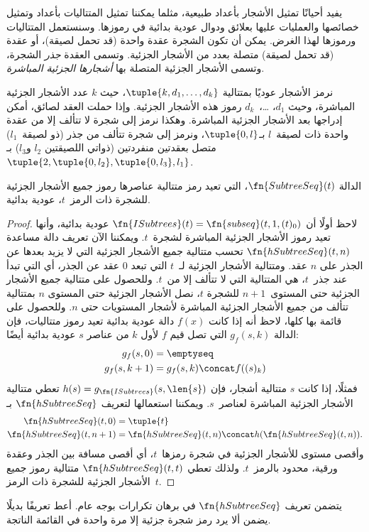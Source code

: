 \documentclass[../../../include/open-logic-section]{subfiles}
\begin{document}

يفيد أحيانًا تمثيل الأشجار بأعداد طبيعية، مثلما يمكننا تمثيل المتتاليات
بأعداد وتمثيل خصائصها والعمليات عليها بعلائق ودوال عودية بدائية في
رموزها. وسنستعمل المتتاليات ورموزها لهذا الغرض. يمكن أن تكون الشجرة
عقدة واحدة (قد تحمل لصيقة)، أو عقدة (قد تحمل لصيقة) متصلة بعدد من
الأشجار الجزئية. وتسمى العقدة \emph{جذر} الشجرة، وتسمى الأشجار الجزئية
المتصلة بها \emph{أشجارها الجزئية المباشرة}.

نرمز الأشجار عوديًا بمتتالية $\tuple{k,d_1,\dots,d_k}$، حيث $k$ عدد
الأشجار الجزئية المباشرة، وحيث $d_1$، …،~$d_k$ رموز هذه الأشجار
الجزئية. وإذا حملت العقد لصائق، أمكن إدراجها بعد الأشجار الجزئية
المباشرة. وهكذا نرمز إلى شجرة لا تتألف إلا من عقدة واحدة ذات لصيقة~$l$
بـ$\tuple{0,l}$، ونرمز إلى شجرة تتألف من جذر (ذو لصيقة~$l_1$) متصل
بعقدتين منفردتين (ذواتي اللصيقتين $l_2$ و$l_3$) بـ
$\tuple{2,\tuple{0,l_2},\tuple{0,l_3},l_1}$.

\begin{prop}
  الدالة $\fn{SubtreeSeq}(t)$، التي تعيد رمز متتالية عناصرها رموز جميع
  الأشجار الجزئية للشجرة ذات الرمز~$t$، عودية بدائية.
\end{prop}

\begin{proof}
  لاحظ أولًا أن $\fn{ISubtrees}(t)=\fn{subseq}(t,1,(t)_0)$ عودية
  بدائية، وأنها تعيد رموز الأشجار الجزئية المباشرة لشجرة~$t$. ويمكننا
  الآن تعريف دالة مساعدة $\fn{hSubtreeSeq}(t,n)$ تحسب متتالية جميع
  الأشجار الجزئية التي لا يزيد بعدها عن الجذر على $n$ عقد. ومتتالية الأشجار الجزئية
  لـ~$t$ التي تبعد $0$ عقد عن الجذر، أي التي تبدأ عند جذر~$t$، هي
  المتتالية التي لا تتألف إلا من~$t$. وللحصول على متتالية جميع الأشجار
  الجزئية حتى المستوى~$n+1$ للشجرة $t$، نصل الأشجار الجزئية حتى المستوى
  $n$ بمتتالية تتألف من جميع الأشجار الجزئية المباشرة لأشجار المستويات
  حتى $n$. وللحصول على قائمة بها كلها، لاحظ أنه إذا كانت $f(x)$ دالة عودية
  بدائية تعيد رموز متتاليات، فإن الدالة $g_f(s,k)$ التي تصل قيم $f$
  لأول $k$ من عناصر $s$ عودية بدائية أيضًا:
    \begin{align*}
      g_f(s, 0) & = \emptyseq\\
      g_f(s, k+1) & = g_f(s, k) \concat f((s)_k)
    \end{align*}
    فمثلًا، إذا كانت $s$ متتالية أشجار، فإن
    $h(s)=g_{\fn{ISubtrees}}(s,\len{s})$ تعطي متتالية الأشجار الجزئية
    المباشرة لعناصر~$s$. ويمكننا استعمالها لتعريف
    $\fn{hSubtreeSeq}$ بـ
    \begin{align*}
      \fn{hSubtreeSeq}(t, 0) & = \tuple{t} \\
      \fn{hSubtreeSeq}(t, n+1) & = \fn{hSubtreeSeq}(t, n) \concat
      h(\fn{hSubtreeSeq}(t, n)).
    \end{align*}
    وأقصى مستوى للأشجار الجزئية في شجرة رمزها~$t$، أي أقصى مسافة بين
    الجذر وعقدة ورقية، محدود بالرمز~$t$. ولذلك تعطي
    $\fn{hSubtreeSeq}(t,t)$ متتالية رموز جميع الأشجار الجزئية للشجرة
    ذات الرمز~$t$.
\end{proof}

\begin{prob}
  يتضمن تعريف $\fn{hSubtreeSeq}$ في برهان
   تكرارات بوجه عام. أعط تعريفًا
  بديلًا يضمن ألا يرد رمز شجرة جزئية إلا مرة واحدة في القائمة الناتجة.
\end{prob}
\end{document}
